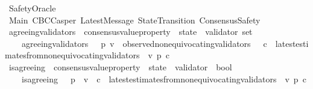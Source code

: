 %
\begin{isabellebody}%
%
%
\isadelimtheory
%
\endisadelimtheory
%
\isatagtheory
{}\isamarkupfalse%
\ SafetyOracle\isanewline
\isanewline
{}\ Main\ CBCCasper\ LatestMessage\ StateTransition\ ConsensusSafety\isanewline
\isanewline
{}%
\endisatagtheory
{\isafoldtheory}%
%
\isadelimtheory
\isanewline
%
\endisadelimtheory
\isanewline
\isanewline
\isanewline
\isanewline
\isanewline
\isanewline
\isanewline
\isanewline
\isanewline
\isanewline
\isanewline
\isanewline
\isanewline
\isanewline
\isanewline
\isanewline
\isanewline
\isanewline
\isanewline
{}\isamarkupfalse%
\ agreeing{\isacharunderscore}validators\ {\isacharcolon}{\isacharcolon}\ {\isachardoublequoteopen}{\isacharparenleft}consensus{\isacharunderscore}value{\isacharunderscore}property\ {\isacharasterisk}\ state{\isacharparenright}\ {\isasymRightarrow}\ validator\ set{\isachardoublequoteclose}\isanewline
\ \ \isanewline
\ \ \ \ {\isachardoublequoteopen}agreeing{\isacharunderscore}validators\ \ {\isacharequal}\ {\isacharparenleft}{\isasymlambda}{\isacharparenleft}p{\isacharcomma}\ {\isasymsigma}{\isacharparenright}{\isachardot}{\isacharbraceleft}v\ {\isasymin}\ observed{\isacharunderscore}non{\isacharunderscore}equivocating{\isacharunderscore}validators\ {\isasymsigma}{\isachardot}\ {\isasymforall}\ c\ {\isasymin}\ latest{\isacharunderscore}estimates{\isacharunderscore}from{\isacharunderscore}non{\isacharunderscore}equivocating{\isacharunderscore}validators\ {\isasymsigma}\ v{\isachardot}\ p\ c{\isacharbraceright}{\isacharparenright}{\isachardoublequoteclose}\isanewline
\isanewline
\isanewline
{}\isamarkupfalse%
\ is{\isacharunderscore}agreeing\ {\isacharcolon}{\isacharcolon}\ {\isachardoublequoteopen}{\isacharparenleft}consensus{\isacharunderscore}value{\isacharunderscore}property\ {\isacharasterisk}\ state\ {\isacharasterisk}\ validator{\isacharparenright}\ {\isasymRightarrow}\ bool{\isachardoublequoteclose}\isanewline
\ \ \isanewline
\ \ \ \ {\isachardoublequoteopen}is{\isacharunderscore}agreeing\ \ {\isacharequal}\ {\isacharparenleft}{\isasymlambda}{\isacharparenleft}p{\isacharcomma}\ {\isasymsigma}{\isacharcomma}\ v{\isacharparenright}{\isachardot}\ {\isasymforall}\ c\ {\isasymin}\ latest{\isacharunderscore}estimates{\isacharunderscore}from{\isacharunderscore}non{\isacharunderscore}equivocating{\isacharunderscore}validators\ {\isasymsigma}\ v{\isachardot}\ p\ c{\isacharparenright}{\isachardoublequoteclose}\isanewline

\end{isabellebody}

